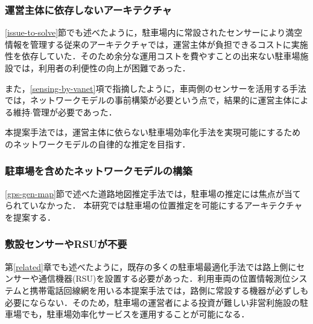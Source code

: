 \subsubsection{運営主体に依存しないアーキテクチャ}
\ref{issue-to-solve}節でも述べたように，駐車場内に常設されたセンサーにより満空情報を管理する従来のアーキテクチャでは，運営主体が負担できるコストに実施性を依存していた．そのため余分な運用コストを費やすことの出来ない駐車場施設では，利用者の利便性の向上が困難であった．

また，\ref{sensing-by-vanet}項で指摘したように，車両側のセンサーを活用する手法では，ネットワークモデルの事前構築が必要という点で，結果的に運営主体による維持$\cdot$管理が必要であった．

本提案手法では，運営主体に依らない駐車場効率化手法を実現可能にするためのネットワークモデルの自律的な推定を目指す．
\subsubsection{駐車場を含めたネットワークモデルの構築}
\ref{gps-gen-map}節で述べた道路地図推定手法では，駐車場の推定には焦点が当てられていなかった．
本研究では駐車場の位置推定を可能にするアーキテクチャを提案する．

\subsubsection{敷設センサーやRSUが不要}
第\ref{related}章でも述べたように，既存の多くの駐車場最適化手法では路上側にセンサーや通信機器(RSU)を設置する必要があった．利用車両の位置情報測位システムと携帯電話回線網を用いる本提案手法では，路側に常設する機器が必ずしも必要にならない．そのため，駐車場の運営者による投資が難しい非営利施設の駐車場でも，駐車場効率化サービスを運用することが可能になる． 



